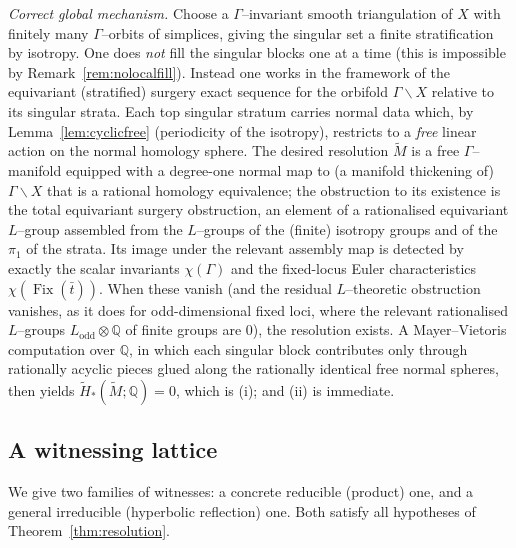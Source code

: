 \documentclass[12pt]{article}
\newcommand{\bQ}{\mathbb{Q}}
\newcommand{\Fix}{\operatorname{Fix}}
\theoremstyle{definition}
\begin{document}
\medskip
\noindent\emph{Correct global mechanism.}  Choose a $\Gamma$--invariant smooth
triangulation of $X$ with finitely many $\Gamma$--orbits of simplices, giving the
singular set a finite stratification by isotropy.  One does \emph{not} fill the
singular blocks one at a time (this is impossible by Remark~\ref{rem:nolocalfill}).
Instead one works in the framework of the equivariant (stratified) surgery exact
sequence for the orbifold $\Gamma\backslash X$ relative to its singular strata.
Each top singular stratum carries normal data which, by
Lemma~\ref{lem:cyclicfree} (periodicity of the isotropy), restricts to a
\emph{free} linear action on the normal homology sphere.  The desired resolution
$\widetilde M$ is a free $\Gamma$--manifold equipped with a degree-one normal map
to (a manifold thickening of) $\Gamma\backslash X$ that is a rational homology
equivalence; the obstruction to its existence is the total equivariant surgery
obstruction, an element of a rationalised equivariant $L$--group assembled from
the $L$--groups of the (finite) isotropy groups and of the $\pi_1$ of the strata.
Its image under the relevant assembly map is detected by exactly the scalar
invariants $\chi(\Gamma)$ and the fixed-locus Euler characteristics
$\chi(\Fix(\bar t))$.  When these vanish (and the residual $L$--theoretic
obstruction vanishes, as it does for odd-dimensional fixed loci, where the
relevant rationalised $L$--groups $L_{\mathrm{odd}}\otimes\bQ$ of finite groups
are $0$), the resolution exists.  A Mayer--Vietoris computation over $\bQ$, in
which each singular block contributes only through rationally acyclic pieces glued
along the rationally identical free normal spheres, then yields
$\widetilde H_*(\widetilde M;\bQ)=0$, which is (i); and (ii) is immediate.

\subsection{A witnessing lattice}

We give two families of witnesses: a concrete reducible (product) one, and a
general irreducible (hyperbolic reflection) one.  Both satisfy all hypotheses of
Theorem~\ref{thm:resolution}.
\end{document}
